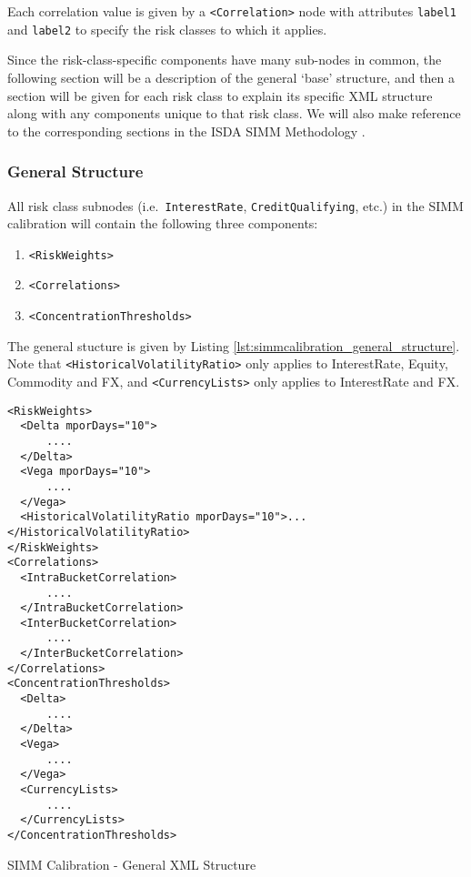 Each correlation value is given by a {\tt <Correlation>} node with attributes {\tt label1} and {\tt label2} to 
specify the risk classes to which it applies.

Since the risk-class-specific components have many sub-nodes in common, the following section will be a description of the
general `base' structure, and then a section will be given for each risk class to explain its specific XML structure along
with any components unique to that risk class. We will also make reference to the corresponding sections in the ISDA
SIMM Methodology \cite{SIMM2.5A}.

\subsubsection{General Structure}

All risk class subnodes (i.e.\ {\tt InterestRate}, {\tt CreditQualifying}, etc.) in the SIMM calibration will contain the following three components:

\begin{enumerate}
  \item {\tt <RiskWeights>}
  \item {\tt <Correlations>}
  \item {\tt <ConcentrationThresholds>}
\end{enumerate}

The general stucture is given by Listing \ref{lst:simmcalibration_general_structure}. Note that
{\tt <HistoricalVolatilityRatio>} only applies to InterestRate, Equity, Commodity and FX, and
{\tt <CurrencyLists>} only applies to InterestRate and FX.

\begin{listing}[H]
\begin{verbatim}
<RiskWeights>
  <Delta mporDays="10">
      ....
  </Delta>
  <Vega mporDays="10">
      ....
  </Vega>
  <HistoricalVolatilityRatio mporDays="10">...</HistoricalVolatilityRatio>
</RiskWeights>
<Correlations>
  <IntraBucketCorrelation>
      ....
  </IntraBucketCorrelation>
  <InterBucketCorrelation>
      ....
  </InterBucketCorrelation>
</Correlations>
<ConcentrationThresholds>
  <Delta>
      ....
  </Delta>
  <Vega>
      ....
  </Vega>
  <CurrencyLists>
      ....
  </CurrencyLists>
</ConcentrationThresholds>
\end{verbatim}
\caption{SIMM Calibration - General XML Structure}
\label{lst:simmcalibration_general_structure}
\end{listing}

